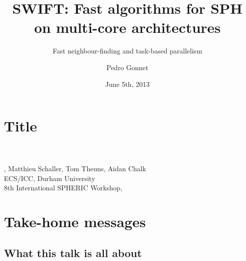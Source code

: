\documentclass{beamer}
\title{SWIFT: Fast algorithms for SPH on multi-core architectures}
\subtitle{Fast neighbour-finding and task-based parallelism}
\author{Pedro Gonnet}
\date{June 5th, 2013}
\begin{document}
    {
        
    \section{Title}
    
    \begin{frame}[plain]
        \color{white}
        \vspace{15ex}
        {\bf\huge \inserttitle \\}
        \vspace{1.5ex}
        \Large \insertsubtitle \\
        \vspace{4ex}
        \large \insertauthor, Matthieu Schaller, Tom Theuns, Aidan Chalk \\
        \vspace{0.2ex} ECS/ICC, Durham University \\
        \vspace{0.2ex} 8th International SPHERIC Workshop, \insertdate \\
    \end{frame}
    }
    
    
    
    \section{Take-home messages}
    \subsection{What this talk is all about}
    
\end{document}
